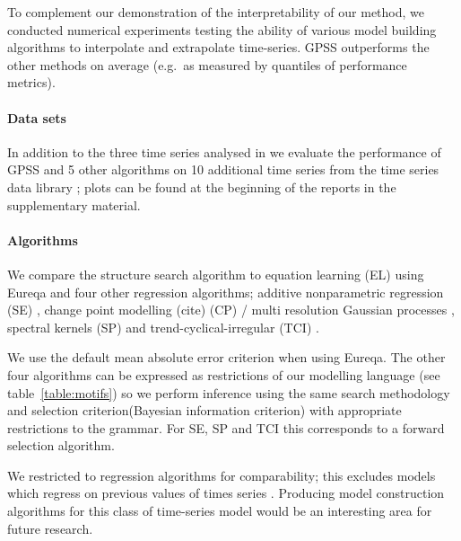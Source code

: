 \documentclass{article}
\def\eg{e.g.\ }
\begin{document}
To complement our demonstration of the interpretability of our method, we conducted numerical experiments testing the ability of various model building algorithms to interpolate and extrapolate time-series.
GPSS outperforms the other methods on average (\eg as measured by quantiles of performance metrics).

\paragraph{Data sets}

In addition to the three time series analysed in \cite{DuvLloGroetal13} we evaluate the performance of GPSS and 5 other algorithms on 10 additional time series from the time series data library \citep{TSDL}; plots can be found at the beginning of the reports in the supplementary material.

\paragraph{Algorithms}

We compare the structure search algorithm to equation learning (EL) using Eureqa \citep{Eureqa} and four other regression algorithms; additive nonparametric regression (SE) \citep[e.g.][]{buja1989linear}, change point modelling (cite) (CP) / multi resolution Gaussian processes \citep[e.g.][]{garnett2010sequential, FoxDunson:NIPS2012}, spectral kernels (SP) \citep{WilAda13} and trend-cyclical-irregular (TCI) \citep[e.g.][]{lind2006basic}.

We use the default mean absolute error criterion when using Eureqa.
The other four algorithms can be expressed as restrictions of our modelling language (see table~\ref{table:motifs}) so we perform inference using the same search methodology and selection criterion\footnotemark (Bayesian information criterion) with appropriate restrictions to the grammar.
For SE, SP and TCI this corresponds to a forward selection algorithm.

We restricted to regression algorithms for comparability; this excludes models which regress on previous values of times series \citep[e.g.][]{box2013time}.
Producing model construction algorithms for this class of time-series model would be an interesting area for future research.
\end{document}
